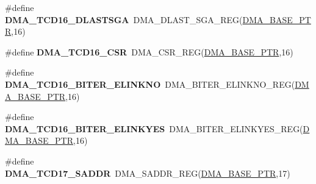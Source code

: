 \begin{DoxyCompactItemize}
\item 
\hypertarget{group___d_m_a___register___accessor___macros_ga2fb52e68a2c736ceb6ac7c2788ecb7b5}{}\#define {\bfseries D\+M\+A\+\_\+\+T\+C\+D16\+\_\+\+D\+L\+A\+S\+T\+S\+G\+A}~D\+M\+A\+\_\+\+D\+L\+A\+S\+T\+\_\+\+S\+G\+A\+\_\+\+R\+E\+G(\hyperlink{group___d_m_a___peripheral_ga6997fbc1b1973e9f27170217a3bd6f22}{D\+M\+A\+\_\+\+B\+A\+S\+E\+\_\+\+P\+T\+R},16)\label{group___d_m_a___register___accessor___macros_ga2fb52e68a2c736ceb6ac7c2788ecb7b5}

\item 
\hypertarget{group___d_m_a___register___accessor___macros_gade5480fb013ff4474b896a7c9c241c53}{}\#define {\bfseries D\+M\+A\+\_\+\+T\+C\+D16\+\_\+\+C\+S\+R}~D\+M\+A\+\_\+\+C\+S\+R\+\_\+\+R\+E\+G(\hyperlink{group___d_m_a___peripheral_ga6997fbc1b1973e9f27170217a3bd6f22}{D\+M\+A\+\_\+\+B\+A\+S\+E\+\_\+\+P\+T\+R},16)\label{group___d_m_a___register___accessor___macros_gade5480fb013ff4474b896a7c9c241c53}

\item 
\hypertarget{group___d_m_a___register___accessor___macros_ga4be53b71782be9e63326cc3b8f6def8e}{}\#define {\bfseries D\+M\+A\+\_\+\+T\+C\+D16\+\_\+\+B\+I\+T\+E\+R\+\_\+\+E\+L\+I\+N\+K\+N\+O}~D\+M\+A\+\_\+\+B\+I\+T\+E\+R\+\_\+\+E\+L\+I\+N\+K\+N\+O\+\_\+\+R\+E\+G(\hyperlink{group___d_m_a___peripheral_ga6997fbc1b1973e9f27170217a3bd6f22}{D\+M\+A\+\_\+\+B\+A\+S\+E\+\_\+\+P\+T\+R},16)\label{group___d_m_a___register___accessor___macros_ga4be53b71782be9e63326cc3b8f6def8e}

\item 
\hypertarget{group___d_m_a___register___accessor___macros_gaba0f74fc70818450880bd4a0014e7218}{}\#define {\bfseries D\+M\+A\+\_\+\+T\+C\+D16\+\_\+\+B\+I\+T\+E\+R\+\_\+\+E\+L\+I\+N\+K\+Y\+E\+S}~D\+M\+A\+\_\+\+B\+I\+T\+E\+R\+\_\+\+E\+L\+I\+N\+K\+Y\+E\+S\+\_\+\+R\+E\+G(\hyperlink{group___d_m_a___peripheral_ga6997fbc1b1973e9f27170217a3bd6f22}{D\+M\+A\+\_\+\+B\+A\+S\+E\+\_\+\+P\+T\+R},16)\label{group___d_m_a___register___accessor___macros_gaba0f74fc70818450880bd4a0014e7218}

\item 
\hypertarget{group___d_m_a___register___accessor___macros_gaeaa97ca04dafbfbd7a1dbe8ec30591e0}{}\#define {\bfseries D\+M\+A\+\_\+\+T\+C\+D17\+\_\+\+S\+A\+D\+D\+R}~D\+M\+A\+\_\+\+S\+A\+D\+D\+R\+\_\+\+R\+E\+G(\hyperlink{group___d_m_a___peripheral_ga6997fbc1b1973e9f27170217a3bd6f22}{D\+M\+A\+\_\+\+B\+A\+S\+E\+\_\+\+P\+T\+R},17)\label{group___d_m_a___register___accessor___macros_gaeaa97ca04dafbfbd7a1dbe8ec30591e0}


\end{DoxyCompactItemize}
